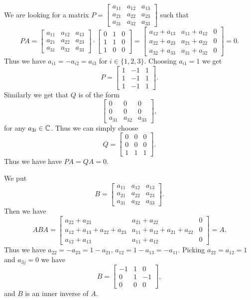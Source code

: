\documentclass{article}
\begin{document}
\begin{solution}
  We are looking for a matrix $P = \begin{bmatrix} a_{11} & a_{12} & a_{13}\\ a_{21} & a_{22} & a_{23}\\ a_{31} & a_{32} & a_{33} \end{bmatrix}$ such that
  \[PA = \begin{bmatrix} a_{11} & a_{12} & a_{13}\\ a_{21} & a_{22} & a_{23}\\ a_{31} & a_{32} & a_{33} \end{bmatrix} \cdot \begin{bmatrix} 0 & 1 & 0\\ 1 & 1 & 0\\ 1 & 0 & 0 \end{bmatrix} = \begin{bmatrix} a_{12} + a_{13} & a_{11} + a_{12} & 0\\ a_{22} + a_{23} & a_{21} + a_{22} & 0\\ a_{32} + a_{33} & a_{31} + a_{32} & 0 \end{bmatrix} = 0.\]
  Thus we have $a_{i1} = - a_{i2} = a_{i3}$ for $i \in \{1, 2, 3\}$.
  Choosing $a_{i1} = 1$ we get
  \[P = \begin{bmatrix} 1 & -1 & 1\\ 1 & -1 & 1\\ 1 & -1 & 1 \end{bmatrix}.\]
  Similarly we get that $Q$ is of the form
  \[\begin{bmatrix} 0 & 0 & 0\\ 0 & 0 & 0\\ a_{31} & a_{32} & a_{33} \end{bmatrix},\]
  for any $a_{3i} \in \mathbb{C}$.
  Thus we can simply choose
  \[Q = \begin{bmatrix} 0 & 0 & 0\\ 0 & 0 & 0\\ 1 & 1 & 1 \end{bmatrix}.\]
  Thus we have have $PA = QA = 0$.

  We put
  \[B = \begin{bmatrix} a_{11} & a_{12} & a_{13}\\ a_{21} & a_{22} & a_{23}\\ a_{31} & a_{32} & a_{33} \end{bmatrix}.\]
  Then we have
  \[ABA = \begin{bmatrix} a_{22} + a_{23} & a_{21} + a_{22} & 0\\ a_{12} + a_{13} + a_{22} + a_{23} & a_{11} + a_{12} + a_{21} + a_{22} & 0\\ a_{12} + a_{13} & a_{11} + a_{12} & 0 \end{bmatrix} = A.\]
  Thus we have $a_{22} = - a_{23} = 1 - a_{21}$, $a_{12} = 1 - a_{13} = - a_{11}$.
  Picking $a_{22} = a_{12} = 1$ and $a_{3j} = 0$ we have
  \[B = \begin{bmatrix} -1 & 1 & 0\\ 0 & 1 & -1\\ 0 & 0 & 0 \end{bmatrix},\]
  and $B$ is an inner inverse of $A$.


\end{solution}
\end{document}
